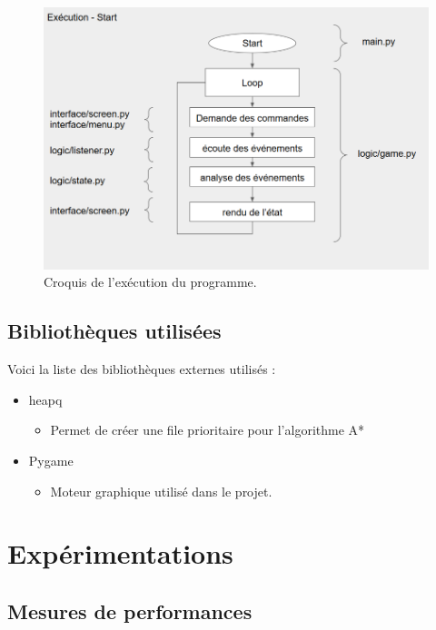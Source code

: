 \documentclass[a4paper,12pt]{article}
\begin{document}
\begin{figure}[H]
\includegraphics[width=\linewidth]{./Illustrations/execution.png}
\caption{Croquis de l'exécution du programme.}
\end{figure}

\subsection{Bibliothèques utilisées}

Voici la liste des bibliothèques externes utilisés :

\begin{itemize}
  \item{heapq}
    \begin{itemize}
      \item{Permet de créer une file prioritaire pour l'algorithme A*}
    \end{itemize}
  \item{Pygame}
    \begin{itemize}
      \item{Moteur graphique utilisé dans le projet.}
    \end{itemize}
\end{itemize}

\newpage

\section{Expérimentations}
\subsection{Mesures de performances}
\end{document}
